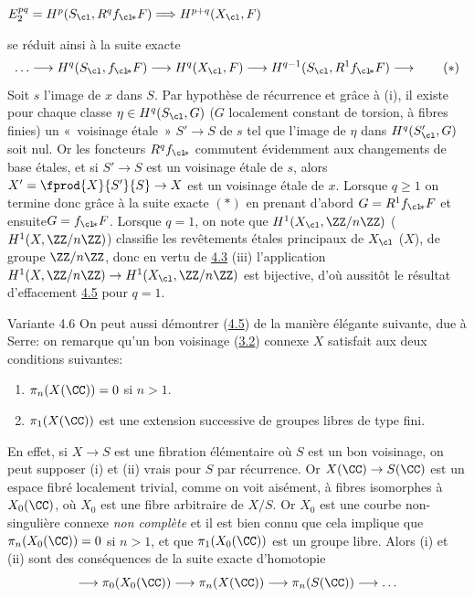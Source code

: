 \documentclass[10pt]{../fichiers-configuration-latex/smfart}
\begin{document}
$E^{pq}_2=H^p(S_{\cl}, R^qf_{\cl\!\ast}F)\Longrightarrow
H^{p+q}(X_{\cl},F)$

\noindent
se réduit ainsi à la suite exacte
\begin{equation*}
\ldots\longrightarrow H^q(S_{\cl},f_{\cl\!\ast}F)\longrightarrow
H^q(X_{\cl},F)\longrightarrow H^{q-1}(S_{\cl},
R^1f_{\cl\!\ast}F)\longrightarrow\tag{$\ast$}
\end{equation*}
Soit $s$ l'image de $x$ dans $S$. Par hypothèse de récurrence et grâce
à (i), il existe pour chaque classe $\eta\in H^q(S_{\cl},G)$ ($G$
localement constant de torsion, à fibres finies) un « voisinage
étale » $S'\rightarrow S$ de $s$ tel que l'image de $\eta$ dans
$H^q(S'_{\cl},G)$ soit nul. Or les foncteurs $R^qf_{\cl\!\ast}$
commutent évidemment aux changements de base étales, et si
$S'\rightarrow S$ est un voisinage étale de $s$, alors
$X'=\fprod{X}{S'}{S}\rightarrow X$ est un voisinage étale de
$x$. Lorsque $q\geq 1$ on termine donc grâce à la suite exacte
$(\ast)$ en prenant d'abord $G=R^1f_{\cl\!\ast}F$ et
ensuite\pageoriginale $G=f_{\cl\!\ast}F$. %
Lorsque $q=1$, on note que
$H^1(X_{\cl},\ZZ/n \ZZ)$ (\resp
$H^1(X,\ZZ/n\ZZ)$) classifie les revêtements étales %
principaux de $X_{\cl}$ (\resp $X$), de groupe
$\ZZ/n\ZZ$, donc en vertu de \hyperref[XI.thm4.3]{4.3} (iii) l'application
$H^1(X,\ZZ/n\ZZ)\rightarrow
H^1(X_{\cl},\ZZ/n\ZZ)$ est bijective, d'où aussitôt le
résultat d'effacement \hyperref[XI.lem4.5]{4.5} pour $q=1$.

\begin{enonce*}[remark]{Variante 4.6}
On peut aussi démontrer (\hyperref[XI.lem4.5]{4.5}) de la manière élégante suivante, due à
Serre: on remarque qu'un bon voisinage (\hyperref[XI.def3.2]{3.2}) connexe $X$ satisfait aux
deux conditions suivantes:
\begin{enumerate}
\renewcommand{\theenumi}{\roman{enumi}}
\renewcommand{\labelenumi}{(\theenumi)}
\item $\pi_n(X(\CC))=0$ si $n>1$.

\item $\pi_1(X(\CC))$ est une extension successive de groupes
libres de type fini.
\end{enumerate}
\end{enonce*}

En effet, si $X\rightarrow S$ est une fibration élémentaire où $S$ est
un bon voisinage, on peut supposer (i) et (ii) vrai{s} pour $S$ par
récurrence. Or $X(\CC)\rightarrow S(\CC)$ est un espace
fibré localement trivial, comme on voit aisément, à fibres isomorphes
à $X_0(\CC)$, où $X_0$ est une fibre arbitraire de
$X/S$. Or $X_0$ est une courbe non-singulière connexe \emph{non
complète} et il est bien connu que cela implique que
$\pi_n(X_0(\CC))=0$ si $n>1$, et que
$\pi_1(X_0(\CC))$ est un groupe libre. %
Alors (i) et (ii)
sont des conséquences de la suite exacte d'homotopie
$$
\longrightarrow \pi_0(X_0(\CC))\longrightarrow
\pi_n (X(\CC))\longrightarrow \pi_n
(S(\CC))\longrightarrow\ldots
$$
\end{document}

